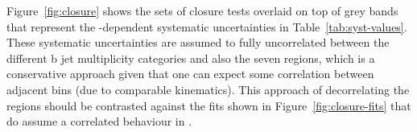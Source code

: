 Figure~\ref{fig:closure} shows the sets of closure tests overlaid on
top of grey bands that represent the \scalht-dependent systematic
uncertainties in Table~\ref{tab:syst-values}. These systematic
uncertainties are assumed to fully uncorrelated between the different
b jet multiplicity categories and also the seven \scalht regions,
which is a conservative approach given that one can expect some
correlation between adjacent \scalht bins (due to comparable
kinematics).  This approach of decorrelating the \scalht regions
should be contrasted against the fits shown in
Figure~\ref{fig:closure-fits} that do assume a correlated behaviour in
\scalht.
%
